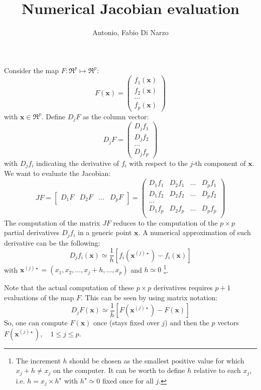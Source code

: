 \documentclass[a4paper,10pt]{article}
\title{Numerical Jacobian evaluation}
\author{Antonio, Fabio Di Narzo}
\begin{document}
\maketitle

Consider the map $F: \Re^p \mapsto \Re^p$:
\[
F(\mathbf{x}) = \left( \begin{array}{c}
f_1(\mathbf{x}) \\
f_2(\mathbf{x}) \\
\ldots\\
f_p(\mathbf{x})
\end{array} \right)
\]
with $\mathbf{x} \in \Re^p$. Define $D_j F$ as the column vector:
\[
D_j F = \left( \begin{array}{c}
D_j f_1 \\
D_j f_2 \\
\ldots\\
D_j f_p 
\end{array}
\right)
\]
with $D_j f_i$ indicating the derivative of $f_i$ with respect to the $j$-th component of $\mathbf{x}$.
We want to evaluate the Jacobian:
\[
JF = \left[ \begin{array}{cccc} D_1F & D_2F & \ldots & D_pF \end{array} \right] = 
\left( \begin{array}{cccc}
D_1 f_1 & D_2 f_1 & \ldots & D_p f_1 \\
D_1 f_2 & D_2 f_2 & \ldots & D_p f_2 \\
\ldots \\
D_1 f_p & D_2 f_p & \ldots & D_p f_p \\
\end{array}\right)
\]
The computation of the matrix $JF$ reduces to the computation of the $p \times p$ partial derivatives $D_j f_i$ in a
generic point $\mathbf{x}$. A numerical approximation of such derivative can be the following:
\[
D_j f_i (\mathbf{x}) \simeq \frac{1}{h} [f_i(\mathbf{x}^{(j)\star}) - f_i(\mathbf{x})]
\]
with $ \mathbf{x}^{(j)\star} = (x_1, x_2, \ldots, x_j+h, \ldots, x_p)$ and $h \simeq 0$ \footnote{
The increment $h$ should be chosen as the smallest positive value for which $x_j+h \neq x_j$ on the computer.
It can be worth to define $h$ relative to each $x_j$, i.e. $h = x_j \times h^\star$
 with $h^\star \simeq 0$ fixed once for all $j$.
}.

Note that the actual computation of these $p \times p$ derivatives requires $p+1$ evaluations of the map $F$.
This can be seen by using matrix notation:
\[
D_jF(\mathbf{x}) \simeq  \frac{1}{h} [F(\mathbf{x}^{(j)\star}) - F(\mathbf{x})]
\]
So, one can compute $F(\mathbf{x})$ once (stays fixed over $j$) and then the $p$ vectors $F(\mathbf{x}^{(j)\star}),
\quad 1\leq j\leq p$.
\end{document}
